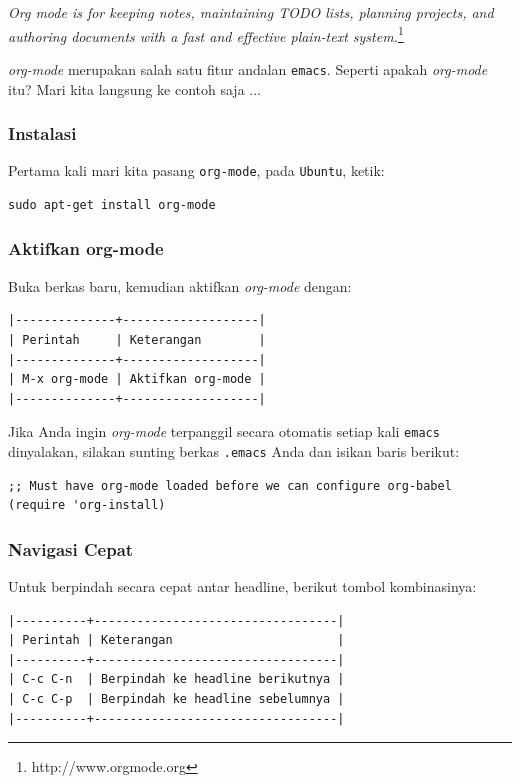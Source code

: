 \documentclass{article}
\begin{document}
\emph{Org mode is for keeping notes, maintaining TODO lists, planning projects, and authoring documents with a fast and effective plain-text system.}\footnote{http://www.orgmode.org}

\emph{org-mode} merupakan salah satu fitur andalan \verb=emacs=. Seperti apakah
\emph{org-mode} itu? Mari kita langsung ke contoh saja ...

\subsubsection{Instalasi}

Pertama kali mari kita pasang \verb=org-mode=, pada \verb=Ubuntu=, ketik:

\begin{verbatim}
sudo apt-get install org-mode
\end{verbatim}

\subsubsection{Aktifkan org-mode}

Buka berkas baru, kemudian aktifkan \emph{org-mode} dengan:

\begin{verbatim}
|--------------+-------------------|
| Perintah     | Keterangan        |
|--------------+-------------------|
| M-x org-mode | Aktifkan org-mode |
|--------------+-------------------|
\end{verbatim}

Jika Anda ingin \emph{org-mode} terpanggil secara otomatis setiap kali
\verb=emacs= dinyalakan, silakan sunting berkas \verb=.emacs= Anda
dan isikan baris berikut:

\begin{verbatim}
;; Must have org-mode loaded before we can configure org-babel
(require 'org-install)
\end{verbatim}

\subsubsection{Navigasi Cepat}
Untuk berpindah secara cepat antar headline, berikut tombol kombinasinya:

\begin{verbatim}
|----------+----------------------------------|
| Perintah | Keterangan                       |
|----------+----------------------------------|
| C-c C-n  | Berpindah ke headline berikutnya |
| C-c C-p  | Berpindah ke headline sebelumnya |
|----------+----------------------------------|
\end{verbatim}
\end{document}
